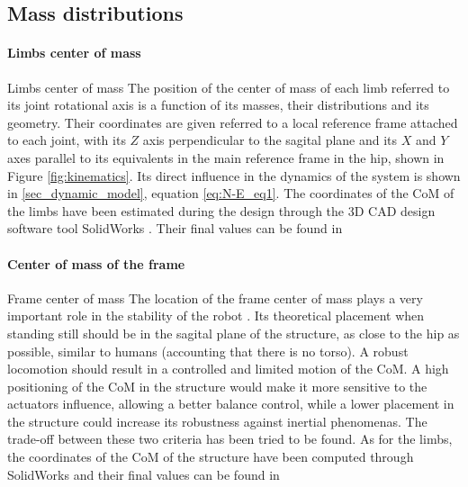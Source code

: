 
\subsection{Mass distributions} %
\label{sub:centers_of_mass}

\paragraph{Limbs center of mass} %
\label{par:limbs_center_of_mass}
Limbs center of mass
The position of the center of mass of each limb referred to its joint rotational axis is a function of its masses, their distributions and its geometry.
Their coordinates are given referred to a local reference frame attached to each joint, with its $Z$ axis perpendicular to the sagital plane and its $X$ and $Y$ axes parallel to its equivalents in the main reference frame in the hip, shown in Figure \ref{fig:kinematics}.
Its direct influence in the dynamics of the system is shown in \ref{sec_dynamic_model}, equation \ref{eq:N-E_eq1}.
The coordinates of the CoM of the limbs have been estimated during the design through the 3D CAD design software tool SolidWorks \cite{solidworks}.
Their final values can be found in %


\paragraph{Center of mass of the frame} %
\label{par:center_of_mass_of_the_frame}
Frame center of mass
The location of the frame center of mass plays a very important role in the stability of the robot \cite{rojas}.
Its theoretical placement when standing still should be in the sagital plane of the structure, as close to the hip as possible, similar to humans (accounting that there is no torso).
A robust locomotion should result in a controlled and limited motion of the CoM. 
A high positioning of the CoM in the structure would make it more sensitive to the actuators influence, allowing a better balance control, while a lower placement in the structure could increase its robustness against inertial phenomenas.
The trade-off between these two criteria has been tried to be found.
As for the limbs, the coordinates of the CoM of the structure have been computed through SolidWorks and their final values can be found in %

